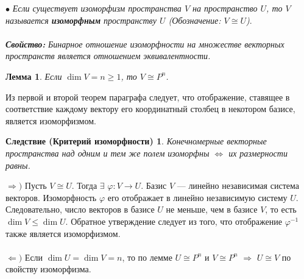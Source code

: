 $\bullet$ \textit{Если существует изоморфизм пространства $V$ на пространство $U$, то $V$ называется \textbf{изоморфным} пространству $U$ (Обозначение: $V \cong U$)}.\\\\
\textbf{\textit{Свойство: }}\textit{Бинарное отношение изоморфности на множестве векторных пространств является отношением эквивалентности.}
\newtheorem*{th4_3}{Лемма}\begin{th4_3} Если $\dim  V = n \geqslant 1$, то $V \cong P^n$.
\end{th4_3}
\begin{Proof}
	Из первой и второй теорем параграфа следует, что отображение, ставящее в соответствие каждому вектору его координатный столбец в некотором базисе, является изоморфизмом.
\end{Proof}
\newtheorem*{th4_4}{Следствие (Критерий изоморфности)}\begin{th4_4} Конечномерные векторные пространства над одним и тем же полем изоморфны $\Longleftrightarrow$ их размерности равны.
\end{th4_4}
\begin{Proof} $\Rightarrow)$ Пусть $V \cong U$. Тогда $\exists$ $\varphi: V \rightarrow U$. Базис $V$ --- линейно независимая система векторов. Изоморфность $\varphi$ его отображает в линейно независимую систему $U$. Следовательно, число векторов в базисе $U$ не меньше, чем в базисе $V$, то есть $\dim V\leqslant \dim  U$. Обратное утверждение следует из того, что отображение $\varphi ^{-1}$ также является изоморфизмом.\\\\
	$\Leftarrow)$ Если $\dim U = \dim V=n$, то по лемме $U \cong P^n$ и $V \cong P^n$ $\Rightarrow$ $U \cong V$ по свойству изоморфизма.
\end{Proof} 












